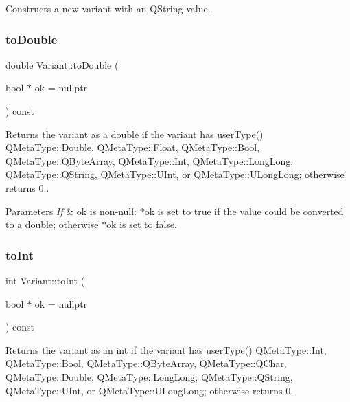 Constructs a new variant with an Q\+String value. 

\mbox{\label{class_variant_a543a5e6579cea7fcd8e6413921e8fd44}} 
\subsubsection{\texorpdfstring{to\+Double}{toDouble}}
{\footnotesize\ttfamily double Variant\+::to\+Double (\begin{DoxyParamCaption}\item[{bool $\ast$}]{ok = {\ttfamily nullptr} }\end{DoxyParamCaption}) const\hspace{0.3cm}{\ttfamily [slot]}}



Returns the variant as a double if the variant has user\+Type() Q\+Meta\+Type\+::\+Double, Q\+Meta\+Type\+::\+Float, Q\+Meta\+Type\+::\+Bool, Q\+Meta\+Type\+::\+Q\+Byte\+Array, Q\+Meta\+Type\+::\+Int, Q\+Meta\+Type\+::\+Long\+Long, Q\+Meta\+Type\+::\+Q\+String, Q\+Meta\+Type\+::\+U\+Int, or Q\+Meta\+Type\+::\+U\+Long\+Long; otherwise returns 0.. 


\begin{DoxyParams}{Parameters}
{\em If} & ok is non-\/null\+: $\ast$ok is set to true if the value could be converted to a double; otherwise $\ast$ok is set to false. \\
\hline
\end{DoxyParams}
\mbox{\label{class_variant_ae38d113834d5d53ca9c7f36366a25288}} 
\subsubsection{\texorpdfstring{to\+Int}{toInt}}
{\footnotesize\ttfamily int Variant\+::to\+Int (\begin{DoxyParamCaption}\item[{bool $\ast$}]{ok = {\ttfamily nullptr} }\end{DoxyParamCaption}) const\hspace{0.3cm}{\ttfamily [slot]}}



Returns the variant as an int if the variant has user\+Type() Q\+Meta\+Type\+::\+Int, Q\+Meta\+Type\+::\+Bool, Q\+Meta\+Type\+::\+Q\+Byte\+Array, Q\+Meta\+Type\+::\+Q\+Char, Q\+Meta\+Type\+::\+Double, Q\+Meta\+Type\+::\+Long\+Long, Q\+Meta\+Type\+::\+Q\+String, Q\+Meta\+Type\+::\+U\+Int, or Q\+Meta\+Type\+::\+U\+Long\+Long; otherwise returns 0. 


